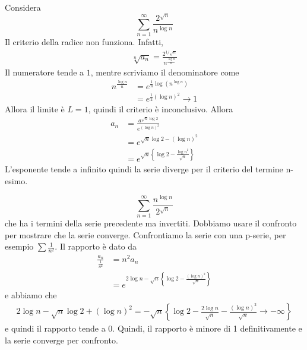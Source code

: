 \documentclass[a4paper]{article}
\begin{document}
\begin{snippetexample}{}
    Considera
    \[
        \sum_{n=1}^\infty
        \frac{
            2^{\sqrt{n}}
        }{
            n^{\log n}
        }
    \]
    Il criterio della radice non funziona. Infatti,
    \begin{align*}
        \sqrt[n]{a_n}
        = \frac{
            2^{1 / \sqrt{n}}
        }{
            n^{\frac{\log n}{n}}
        }
    \end{align*}
    Il numeratore tende a \(1\),
    mentre scriviamo il denominatore come
    \begin{align*}
        n^{\frac{\log n}{n}} &=
        e^{\frac{1}{n}\log \left(n^{\log n}\right)} \\
        &= e^{\frac{1}{2}{\left(\log n\right)}^2} \to 1
    \end{align*}
    Allora il limite è \(L=1\), quindi il criterio è inconclusivo.
    Allora
    \begin{align*}
        a_n &= \frac{
            a^{\sqrt{n}\log 2}
        }{
            e^{{(\log n)}^2}
        } \\
        &= e^{\sqrt{n} \log 2 - {\left(\log n\right)}^2} \\
        &= e^{\sqrt{n} \left\{\log 2 - \frac{{\log n}^2}{\sqrt{n}}\right\}}
    \end{align*}
    L'esponente tende a infinito quindi la serie diverge per il criterio
    del termine n-esimo.
\end{snippetexample}

\begin{snippetexample}{}
    \[
        \sum_{n=1}^\infty
        \frac{
            n^{\log n}
        }{
            2^{\sqrt{n}}
        }
    \]
    che ha i termini della serie precedente ma invertiti.
    Dobbiamo usare il confronto per mostrare che la serie converge.
    Confrontiamo la serie con una p-serie, per esempio \(\sum\frac{1}{n^2}\).
    Il rapporto è dato da
    \begin{align*}
        \frac{a_n}{\frac{1}{n^2}}
        &= n^2 a_n  \\
        &= e^{2\log n - \sqrt{n}\left\{\log 2 - \frac{{(\log n)}^2}{\sqrt{n}}\right\}}
    \end{align*}
    e abbiamo che
    \begin{align*}
        2\log n - \sqrt{n}\log 2 + {(\log n)}^2
        = -\sqrt{n} \left\{
            \log 2 - \frac{2\log n}{\sqrt{n}}
            - \frac{{(\log n)}^2}{\sqrt{n}} \to -\infty
        \right\}
    \end{align*}
    e quindi il rapporto tende a \(0\). Quindi,
    il rapporto è minore di 1 definitivamente
    e la serie converge per confronto.
\end{snippetexample}
\end{document}
